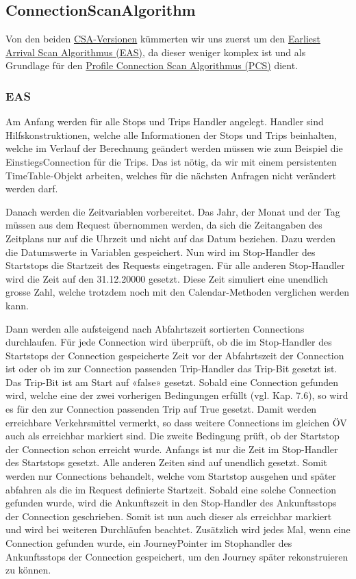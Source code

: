 \subsection{ConnectionScanAlgorithm}
Von den beiden \hyperlink{CSA}{CSA-Versionen}\cite{csa} kümmerten wir uns zuerst um den \hyperlink{EAS}{Earliest Arrival Scan Algorithmus (EAS)}, da dieser weniger komplex ist und als Grundlage für den \hyperlink{PCS}{Profile Connection Scan Algorithmus (PCS)} dient.
\subsubsection{EAS}
Am Anfang werden für alle Stops und Trips Handler angelegt. Handler sind Hilfskonstruktionen, welche alle Informationen der Stops und Trips beinhalten, welche im Verlauf der Berechnung geändert werden müssen wie zum Beispiel die EinstiegsConnection für die Trips. Das ist nötig, da wir mit einem persistenten TimeTable-Objekt arbeiten, welches für die nächsten Anfragen nicht verändert werden darf.
\newline


Danach werden die Zeitvariablen vorbereitet. Das Jahr, der Monat und der Tag müssen aus dem Request übernommen werden, da sich die Zeitangaben des Zeitplans nur auf die Uhrzeit und nicht auf das Datum beziehen. Dazu werden die Datumswerte in Variablen gespeichert.  Nun wird im Stop-Handler des Startstops die Startzeit des Requests eingetragen. Für alle anderen Stop-Handler wird die Zeit auf den 31.12.20000 gesetzt. Diese Zeit simuliert eine unendlich grosse Zahl, welche trotzdem noch mit den Calendar-Methoden verglichen werden kann.
\newline


Dann werden alle aufsteigend nach Abfahrtszeit sortierten Connections durchlaufen. Für jede Connection wird überprüft, ob die im Stop-Handler des Startstops der Connection gespeicherte Zeit vor der Abfahrtszeit der Connection ist oder ob im zur Connection passenden Trip-Handler das Trip-Bit gesetzt ist. Das Trip-Bit ist am Start auf «false» gesetzt. Sobald eine Connection gefunden wird, welche eine der zwei vorherigen Bedingungen erfüllt (vgl. Kap. 7.6), so wird es für den zur Connection passenden Trip auf True gesetzt. Damit werden erreichbare Verkehrsmittel vermerkt, so dass weitere Connections im gleichen ÖV auch als erreichbar markiert sind. Die zweite Bedingung prüft, ob der Startstop der Connection schon erreicht wurde. Anfangs ist nur die Zeit im Stop-Handler des Startstops gesetzt. Alle anderen Zeiten sind auf unendlich gesetzt. Somit werden nur Connections behandelt, welche vom Startstop ausgehen und später abfahren als die im Request definierte Startzeit. Sobald eine solche Connection gefunden wurde, wird die Ankunftszeit in den Stop-Handler des Ankunftsstops der Connection geschrieben. Somit ist nun auch dieser als erreichbar markiert und wird bei weiteren Durchläufen beachtet. Zusätzlich wird jedes Mal, wenn eine Connection gefunden wurde, ein JourneyPointer im Stophandler des Ankunftsstops der Connection gespeichert, um den Journey später rekonstruieren zu können.
\newline


